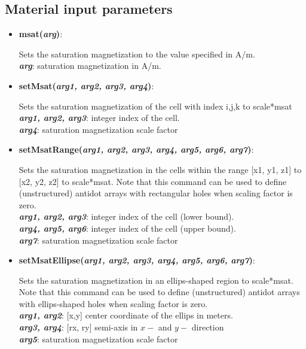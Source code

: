 \subsection{Material input parameters}

\begin{itemize}
 \item {\textbf{msat(\textit{arg})}:
				\flushright\parbox{0.9 \textwidth}{\vspace{-0.25cm} 
				Sets the saturation magnetization to the value specified in A/m.\\
				\textbf{\textit{arg}}: saturation magnetization in A/m.
				}\flushleft}
 
 \item {\vspace{-0.4cm}\textbf{setMsat(\textit{arg1, arg2, arg3, arg4})}:
				\flushright\parbox{0.9 \textwidth}{\vspace{-0.25cm} 
				Sets the saturation magnetization of the cell with index i,j,k to scale*msat\\
				\textbf{\textit{arg1, arg2, arg3}}: integer index of the cell.\\
				\textbf{\textit{arg4}}: saturation magnetization scale factor
				}\flushleft}

 \item {\vspace{-0.4cm}\textbf{setMsatRange(\textit{arg1, arg2, arg3, arg4, arg5, arg6, arg7})}:
				\flushright\parbox{0.9 \textwidth}{\vspace{-0.25cm} 
				Sets the saturation magnetization in the cells within the range [x1, y1, z1] to [x2, y2, z2] to scale*msat.  Note that this command can be used to define (unstructured) antidot arrays with rectangular holes when scaling factor is zero.\\
				\textbf{\textit{arg1, arg2, arg3}}: integer index of the cell (lower bound).\\
				\textbf{\textit{arg4, arg5, arg6}}: integer index of the cell (upper bound).\\
				\textbf{\textit{arg7}}: saturation magnetization scale factor
				}\flushleft}

 \item {\vspace{-0.4cm}\textbf{setMsatEllipse(\textit{arg1, arg2, arg3, arg4, arg5, arg6, arg7})}:
				\flushright\parbox{0.9 \textwidth}{\vspace{-0.25cm} 
				Sets the saturation magnetization in an ellips-shaped region to scale*msat.  Note that this command can be used to define (unstructured) antidot arrays with ellips-shaped holes when scaling factor is zero.\\
				\textbf{\textit{arg1, arg2}}: [x,y] center coordinate of the ellips in meters.\\
				\textbf{\textit{arg3, arg4}}: [rx, ry] semi-axis in $x-$ and $y-$ direction\\
				\textbf{\textit{arg5}}: saturation magnetization scale factor
				}\flushleft}


\end{itemize}
